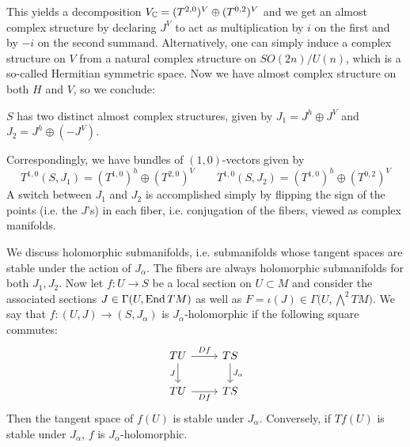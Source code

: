 \documentclass{scrartcl}
\begin{document}
\medskip

This yields a decomposition $V_{\mathbb{C}}=(T^{2,0})^V\oplus (T^{0,2})^V$ and we get an almost complex structure by declaring $J^V$ to act as multiplication by $i$ on the first and by $-i$ on the second summand. Alternatively, one can simply induce a complex structure on $V$ from a natural complex structure on $SO(2n)/U(n)$, which is a so-called Hermitian symmetric space. Now we have almost complex structure on both $H$ and $V$, so we conclude:

\begin{prop}
	$S$ has two distinct almost complex structures, given by $J_1=J^h\oplus J^V$ and $J_2=J^h\oplus (-J^V)$.
\end{prop}

Correspondingly, we have bundles of $(1,0)$-vectors given by
\begin{equation*}
T^{1,0}(S,J_1)=(T^{1,0})^h\oplus (T^{2,0})^V\qquad 
T^{1,0}(S,J_2)=(T^{1,0})^h\oplus (T^{0,2})^V
\end{equation*}
A switch between $J_1$ and $J_2$ is accomplished simply by flipping the sign of the points (i.e. the $J$'s) in each fiber, i.e. conjugation of the fibers, viewed as complex manifolds.

\medskip

We discuss holomorphic submanifolds, i.e. submanifolds whose tangent spaces are stable under the action of $J_\alpha$. The fibers are always holomorphic submanifolds for both $J_1,J_2$. Now let $f:U\to S$ be a local section on $U\subset M$ and consider the associated sections $J\in \Gamma(U,\operatorname{End} TM)$ as well as $F=\iota (J)\in \Gamma\big(U,\bigwedge^2 TM\big)$. We say that $f:(U,J)\to (S,J_\alpha)$ is $J_\alpha$-holomorphic if the following square commutes:
\begin{equation*}
\begin{tikzcd}
TU \ar[r,"\dif f"] \ar[d,"J"'] & TS \ar[d,"J_\alpha"] \\
TU \ar[r,"\dif f"'] & TS
\end{tikzcd}
\end{equation*} 
Then the tangent space of $f(U)$ is stable under $J_\alpha$. Conversely, if $Tf(U)$ is stable under $J_\alpha$, $f$ is $J_\alpha$-holomorphic.
\end{document}
